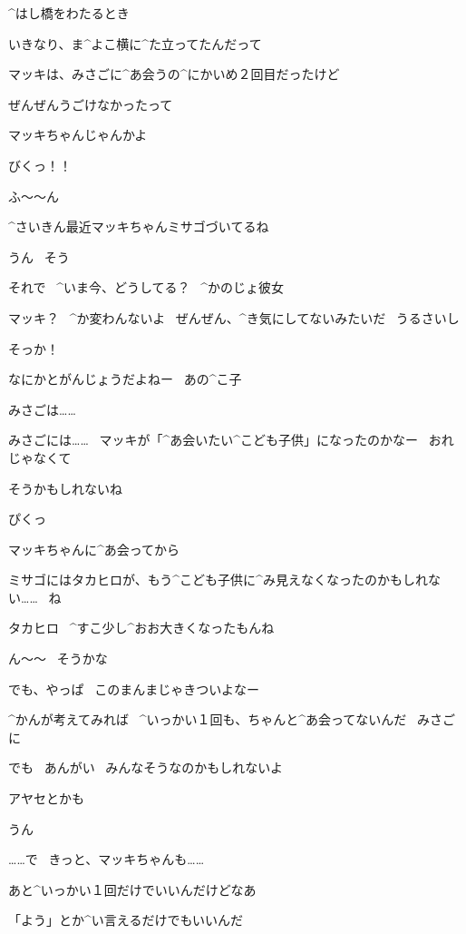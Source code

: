 \Takahiro ^{はし}{橋}をわたるとき

\page[92]
\Takahiro いきなり、ま^{よこ}{横}に^{た}{立}ってたんだって

\Takahiro マッキは、みさごに^{あ}{会}うの^{にかいめ}{２回目}だったけど

\page[93]
\Takahiro ぜんぜんうごけなかったって

\Person マッキちゃんじゃんかよ

\Makki びくっ！！

\page[94]
\Alpha ふ〜〜ん

\Alpha ^{さいきん}{最近}マッキちゃんミサゴづいてるね

\Takahiro うん
\ そう

\page[95]
\Alpha それで
\ ^{いま}{今}、どうしてる？
\ ^{かのじょ}{彼女}

\Takahiro マッキ？
\ ^{か}{変}わんないよ
\ ぜんぜん、^{き}{気}にしてないみたいだ
\ うるさいし

\Alpha そっか！

\Alpha なにかとがんじょうだよねー
\ あの^{こ}{子}

\Takahiro みさごは……

\page[96]
\Takahiro みさごには……
\ マッキが「^{あ}{会}いたい^{こども}{子供}」になったのかなー
\ おれじゃなくて

\Alpha そうかもしれないね

\Takahiro ぴくっ

\page[97]
\Alpha マッキちゃんに^{あ}{会}ってから

\Alpha ミサゴにはタカヒロが、もう^{こども}{子供}に^{み}{見}えなくなったのかもしれない……
\ ね

\page[98]
\Alpha タカヒロ
\ ^{すこ}{少}し^{おお}{大}きくなったもんね

\page[99]
\Takahiro ん〜〜
\ そうかな

\Takahiro でも、やっぱ
\ このまんまじゃきついよなー

\Takahiro ^{かんが}{考}えてみれば
\ ^{いっかい}{１回}も、ちゃんと^{あ}{会}ってないんだ
\ みさごに

\page[100]
\Alpha でも
\ あんがい
\ みんなそうなのかもしれないよ

\Takahiro アヤセとかも

\Alpha うん

\Alpha ……で
\ きっと、マッキちゃんも……

\page[101]
\Takahiro あと^{いっかい}{１回}だけでいいんだけどなあ

\Takahiro 「よう」とか^{い}{言}えるだけでもいいんだ

